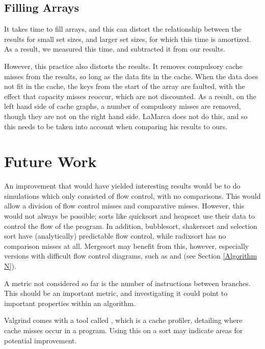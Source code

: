 \subsection{Filling Arrays}

It takes time to fill arrays, and this can distort the relationship between the
results for small set sizes, and larger set sizes, for which this time is
amortized. As a result, we measured this time, and subtracted it from our
results.

However, this practice also distorts the results. It removes compulsory cache
misses from the results, so long as the data fits in the cache. When the data
does not fit in the cache, the keys from the start of the array are faulted,
with the effect that capacity misses reoccur, which are not discounted. As a
result, on the left hand side of cache graphs, a number of compulsory misses are
removed, though they are not on the right hand side. LaMarca does not do this,
and so this needs to be taken into account when comparing his results to ours.


\section{Future Work}
An improvement that would have yielded interesting results would be to do
simulations which only consisted of flow control, with no comparisons. This
would allow a division of flow control misses and comparative misses. However,
this would not always be possible; sorts like quicksort and heapsort use their
data to control the flow of the program. In addition, bubblesort, shakersort and
selection sort have (analytically) predictable flow control, while radixsort has
no comparison misses at all. Mergesort may benefit from this, however,
especially versions with difficult flow control diagrams, such as  and  (see Section \ref{Algorithm N}).

A metric not considered so far is the number of instructions between branches.
This should be an important metric, and investigating it could point to
important properties within an algorithm.

Valgrind comes with a tool called , which is a cache
profiler, detailing where cache misses occur in a program. Using this on a
sort may indicate areas for potential improvement.
